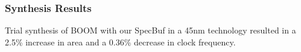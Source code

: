 \subsubsection{Synthesis Results} \label{Synthesis Results}
Trial synthesis of BOOM with our SpecBuf in a 45nm technology resulted in a 2.5\% increase in area and a 0.36\% decrease in clock frequency.


